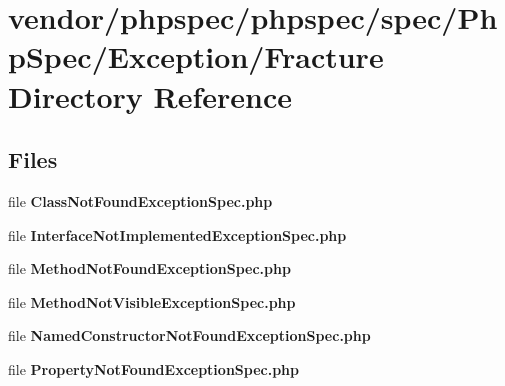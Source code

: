 \section{vendor/phpspec/phpspec/spec/\+Php\+Spec/\+Exception/\+Fracture Directory Reference}
\label{dir_8037424d2ec5d7ccba8f229565b19c58}
\subsection*{Files}
\begin{DoxyCompactItemize}
\item 
file {\bf Class\+Not\+Found\+Exception\+Spec.\+php}
\item 
file {\bf Interface\+Not\+Implemented\+Exception\+Spec.\+php}
\item 
file {\bf Method\+Not\+Found\+Exception\+Spec.\+php}
\item 
file {\bf Method\+Not\+Visible\+Exception\+Spec.\+php}
\item 
file {\bf Named\+Constructor\+Not\+Found\+Exception\+Spec.\+php}
\item 
file {\bf Property\+Not\+Found\+Exception\+Spec.\+php}
\end{DoxyCompactItemize}
